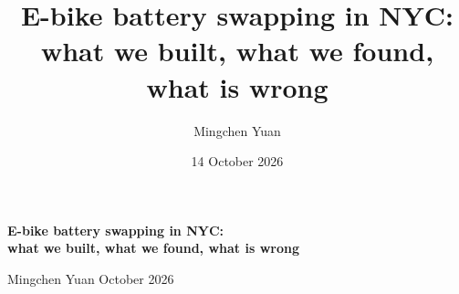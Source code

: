 \documentclass[11pt,a4paper]{article}
\title{E-bike battery swapping in NYC: what we built, what we found, what is wrong}
\author{Mingchen Yuan}
\date{14 October 2026}
\begin{document}
\begin{center}
{\Large\bfseries E-bike battery swapping in NYC:\\[2pt] what we built, what we found, what is wrong\par}\vspace{2pt}
{\normalsize Mingchen Yuan \quad\textperiodcentered{} October 2026\par}
\end{center}
\vspace{-6pt}

\end{document}
